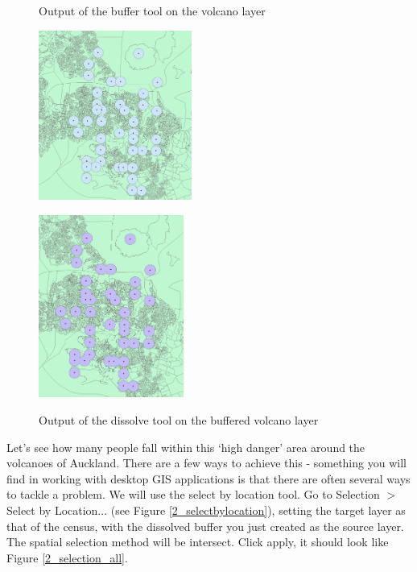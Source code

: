 \documentclass{article}
\begin{document}
\pagebreak

\begin{figure}[h]
  \centering
  \begin{minipage}[b]{0.4\textwidth}
    \centering
    \caption{Output of the buffer tool on the volcano layer}
    \includegraphics[width=190px]{images/part2/volcano_buffer_output.PNG}
    \label{2_buffer_output}
  \end{minipage}
  \hfill
  \begin{minipage}[b]{0.4\textwidth}
    \centering
    \caption{Output of the dissolve tool on the buffered volcano layer}
    \includegraphics[width=180px]{images/part2/volcano_buffer_dissolved_output.PNG}
    \label{2_dissolved_output}
  \end{minipage}
\end{figure}

Let's see how many people fall within this `high danger' area around the volcanoes of Auckland. There are a few ways to achieve this - something you will find in working with desktop GIS applications is that there are often several ways to tackle a problem. We will use the select by location tool. Go to Selection $>$ Select by Location... (see Figure \ref{2_selectbylocation}), setting the target layer as that of the census, with the dissolved buffer you just created as the source layer. The spatial selection method will be intersect. Click apply, it should look like Figure \ref{2_selection_all}. 
\end{document}
